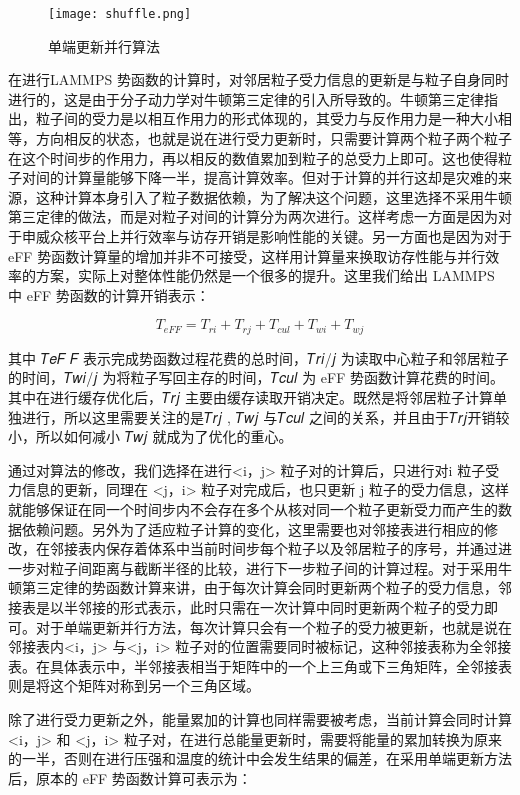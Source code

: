  \begin{figure}[h]
  \centering
  \texttt{[image: shuffle.png]}
  \caption{单端更新并行算法}
\end{figure}

 在进行LAMMPS 势函数的计算时，对邻居粒子受力信息的更新是与粒子自身同时进行的，这是由于分子动力学对牛顿第三定律的引入所导致的。牛顿第三定律指出，粒子间的受力是以相互作用力的形式体现的，其受力与反作用力是一种大小相等，方向相反的状态，也就是说在进行受力更新时，只需要计算两个粒子两个粒子在这个时间步的作用力，再以相反的数值累加到粒子的总受力上即可。这也使得粒子对间的计算量能够下降一半，提高计算效率。但对于计算的并行这却是灾难的来源，这种计算本身引入了粒子数据依赖，为了解决这个问题，这里选择不采用牛顿第三定律的做法，而是对粒子对间的计算分为两次进行。这样考虑一方面是因为对于申威众核平台上并行效率与访存开销是影响性能的关键。另一方面也是因为对于eFF 势函数计算量的增加并非不可接受，这样用计算量来换取访存性能与并行效率的方案，实际上对整体性能仍然是一个很多的提升。这里我们给出 LAMMPS 中 eFF 势函数的计算开销表示：

 \begin{equation}
   T_{eFF}=T_{ri}+T_{rj}+T_{cul}+T_{wi}+T_{wj}
 \end{equation}

其中 𝑇𝑒𝐹 𝐹 表示完成势函数过程花费的总时间，𝑇𝑟𝑖/𝑗 为读取中心粒子和邻居粒子的时间，𝑇𝑤𝑖/𝑗 为将粒子写回主存的时间，𝑇𝑐𝑢𝑙 为 eFF 势函数计算花费的时间。其中在进行缓存优化后，𝑇𝑟𝑗 主要由缓存读取开销决定。既然是将邻居粒子计算单独进行，所以这里需要关注的是𝑇𝑟𝑗 , 𝑇𝑤𝑗 与𝑇𝑐𝑢𝑙 之间的关系，并且由于𝑇𝑟𝑗开销较小，所以如何减小 𝑇𝑤𝑗 就成为了优化的重心。

通过对算法的修改，我们选择在进行<i，j> 粒子对的计算后，只进行对i 粒子受力信息的更新，同理在 <j，i> 粒子对完成后，也只更新 j 粒子的受力信息，这样就能够保证在同一个时间步内不会存在多个从核对同一个粒子更新受力而产生的数据依赖问题。另外为了适应粒子计算的变化，这里需要也对邻接表进行相应的修改，在邻接表内保存着体系中当前时间步每个粒子以及邻居粒子的序号，并通过进一步对粒子间距离与截断半径的比较，进行下一步粒子间的计算过程。对于采用牛顿第三定律的势函数计算来讲，由于每次计算会同时更新两个粒子的受力信息，邻接表是以半邻接的形式表示，此时只需在一次计算中同时更新两个粒子的受力即可。对于单端更新并行方法，每次计算只会有一个粒子的受力被更新，也就是说在邻接表内<i，j> 与<j，i> 粒子对的位置需要同时被标记，这种邻接表称为全邻接表。在具体表示中，半邻接表相当于矩阵中的一个上三角或下三角矩阵，全邻接表则是将这个矩阵对称到另一个三角区域。

除了进行受力更新之外，能量累加的计算也同样需要被考虑，当前计算会同时计算 <i，j> 和 <j，i> 粒子对，在进行总能量更新时，需要将能量的累加转换为原来的一半，否则在进行压强和温度的统计中会发生结果的偏差，在采用单端更新方法后，原本的 eFF 势函数计算可表示为：

